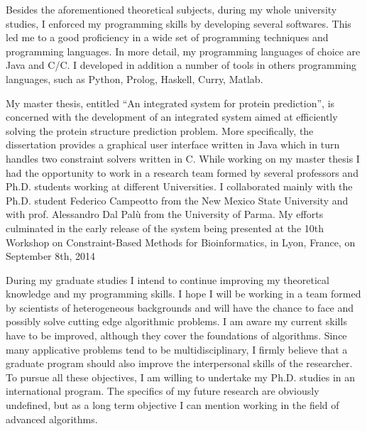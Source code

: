 \documentclass{article}
\newcommand{\CC}{C\nolinebreak\hspace{-.05em}\raisebox{.4ex}{\tiny\bf +}\nolinebreak\hspace{-.10em}\raisebox{.4ex}{\tiny\bf +}}
\begin{document}
Besides the aforementioned theoretical subjects, during my whole university studies, I enforced my programming skills by developing several softwares. This led me to a good proficiency in a wide set of programming techniques and programming languages. In more detail, my programming languages of choice are Java and \CC/C. I developed in addition a number of tools in others programming languages, such as Python, Prolog, Haskell, Curry, Matlab.

\bigskip

My master thesis, entitled ``An integrated system for protein prediction'', is concerned with the development of an integrated system aimed at efficiently solving the protein structure prediction problem. More specifically, the dissertation provides a graphical user interface written in Java which in turn handles two constraint solvers written in \CC. While working on my master thesis I had the opportunity to work in a research team formed by several professors and Ph.D. students working at different Universities. I collaborated mainly with the Ph.D. student Federico Campeotto from the New Mexico State University and with prof. Alessandro Dal Palù from the University of Parma. My efforts culminated in the early release of the system being presented at the 10th Workshop on Constraint-Based Methods for Bioinformatics, in Lyon, France, on September 8th, 2014

\bigskip

During my graduate studies I intend to continue improving my theoretical knowledge and my programming skills. I hope I will be working in a team formed by scientists of heterogeneous backgrounds and will have the chance to face and possibly solve cutting edge algorithmic problems. I am aware my current skills have to be improved, although they cover the foundations of algorithms. Since many applicative problems tend to be multidisciplinary, I firmly believe that a graduate program should also improve the interpersonal skills of the researcher. To pursue all these objectives, I am willing to undertake my Ph.D. studies in an international program. The specifics of my future research are obviously undefined, but as a long term objective I can mention working in the field of advanced algorithms.
\end{document}
